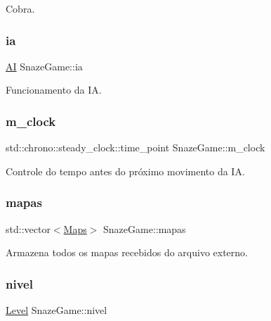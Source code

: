Cobra. 

\mbox{\label{classSnazeGame_adaf01e03323aed1a69936416e5aa44db}} 
\subsubsection{\texorpdfstring{ia}{ia}}
{\footnotesize\ttfamily \hyperlink{classAI}{AI} Snaze\+Game\+::ia\hspace{0.3cm}{\ttfamily [private]}}



Funcionamento da IA. 

\mbox{\label{classSnazeGame_a394c65f61b0cf9c4a5fc5a24d0b5b4f4}} 
\subsubsection{\texorpdfstring{m\+\_\+clock}{m\_clock}}
{\footnotesize\ttfamily std\+::chrono\+::steady\+\_\+clock\+::time\+\_\+point Snaze\+Game\+::m\+\_\+clock\hspace{0.3cm}{\ttfamily [private]}}



Controle do tempo antes do próximo movimento da IA. 

\mbox{\label{classSnazeGame_a0bae7bc31a288d55714d90f574cc8bd1}} 
\subsubsection{\texorpdfstring{mapas}{mapas}}
{\footnotesize\ttfamily std\+::vector$<$\hyperlink{classMaps}{Maps}$>$ Snaze\+Game\+::mapas\hspace{0.3cm}{\ttfamily [private]}}



Armazena todos os mapas recebidos do arquivo externo. 

\mbox{\label{classSnazeGame_a5940b3ae2bdfe8ad2c38d8144a77e9b2}} 
\subsubsection{\texorpdfstring{nivel}{nivel}}
{\footnotesize\ttfamily \hyperlink{classLevel}{Level} Snaze\+Game\+::nivel\hspace{0.3cm}{\ttfamily [private]}}



